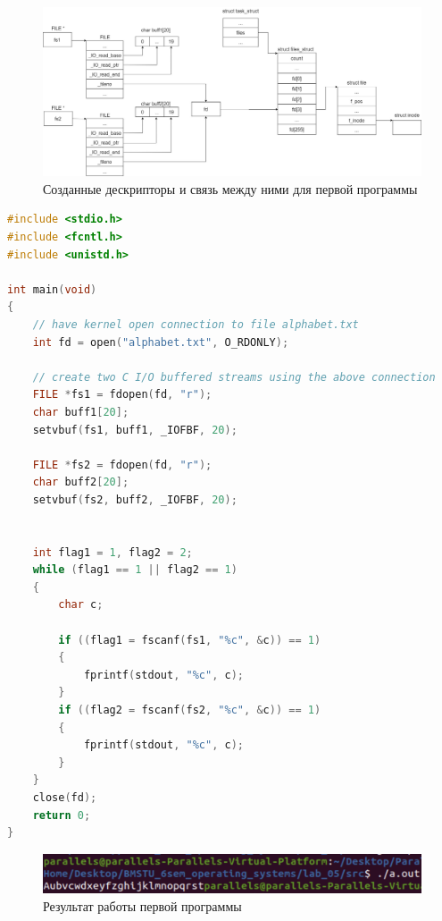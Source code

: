 \documentclass[12pt]{report}
\begin{document}
\begin{figure}[H]
	\centering
	\includegraphics[scale=0.3]{img/prog_01_schema.jpg}
	\caption{Созданные дескрипторы и связь между ними для первой программы}
	\label{fig:prog_01_schema}
\end{figure}

\begin{lstlisting}[language=c, label=p1, caption=Первая программа]
#include <stdio.h>
#include <fcntl.h>
#include <unistd.h>

int main(void)
{
	// have kernel open connection to file alphabet.txt
    int fd = open("alphabet.txt", O_RDONLY);

	// create two C I/O buffered streams using the above connection 
    FILE *fs1 = fdopen(fd, "r");
    char buff1[20];
    setvbuf(fs1, buff1, _IOFBF, 20);

    FILE *fs2 = fdopen(fd, "r");
    char buff2[20];
    setvbuf(fs2, buff2, _IOFBF, 20);


    int flag1 = 1, flag2 = 2;
    while (flag1 == 1 || flag2 == 1)
    {
        char c;

        if ((flag1 = fscanf(fs1, "%c", &c)) == 1)
        {
            fprintf(stdout, "%c", c);
        }
        if ((flag2 = fscanf(fs2, "%c", &c)) == 1)
        {
            fprintf(stdout, "%c", c);
        }
    }
    close(fd);
    return 0;
}
\end{lstlisting}



\begin{figure}[H]
	\centering
	\includegraphics[scale=0.8]{img/prog_01.png}
	\caption{Результат работы первой программы}
	\label{fig:prog_01}
\end{figure}
\end{document}
